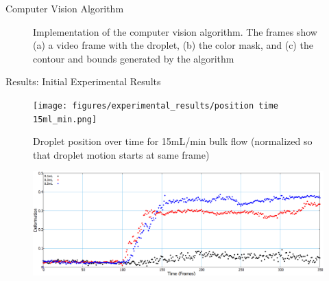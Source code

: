 \documentclass[final]{beamer}
\newlength{\colwidth}
\begin{document}
\begin{frame}[t]
\begin{columns}[t]
\begin{column}{\colwidth}
\begin{block}{Computer Vision Algorithm}
\begin{figure}[htbp]
\begin{minipage}{0.45\textwidth}
        \end{minipage}
        \hfill
        \begin{minipage}{0.45\textwidth}
            \centering
        \end{minipage}
        \caption{Implementation of the computer vision algorithm. The frames show (a) a video frame with the droplet, (b) the color mask, and (c) the contour and bounds generated by the algorithm}
        \label{fig:CV_algorithm}
    \end{figure}

  \end{block}

  \begin{block}{Results: Initial Experimental Results}
      \begin{figure}
      \centering
      \texttt{[image: figures/experimental\_results/position time 15ml\_min.png]}
      \caption{Droplet position over time for 15mL/min bulk flow (normalized so that droplet motion starts at same frame)}
    \end{figure}
    \begin{figure}
        \centering
        \begin{minipage}{0.6\textwidth}
            \centering
            \includegraphics[width=\linewidth]{figures/experimental_results/deformation time 15ml_min.png}


\end{minipage}
\end{figure}
\end{block}
\end{column}
\end{columns}
\end{frame}
\end{document}
